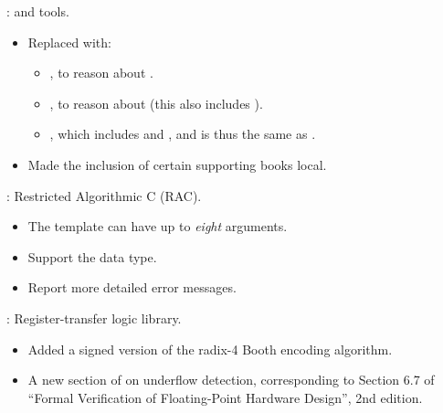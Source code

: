 
\begin{frame}

\implibtitle

:
 and  tools.
\begin{itemize}
\item Replaced  with:
      \begin{itemize}
      \item {}, to reason about .
      \item {}, to reason about 
            (this also includes ).
      \item {},
            which includes  and ,
            and is thus the same as .
      \end{itemize}
\item Made the inclusion of certain supporting books local.
\end{itemize}

\end{frame}


\begin{frame}

\implibtitle

:
Restricted Algorithmic C (RAC).
\begin{itemize}
\item The  template can have up to {\em eight} arguments.
\item Support the  data type.
\item Report more detailed error messages.
\end{itemize}

\end{frame}


\begin{frame}

\implibtitle

:
Register-transfer logic library.
\begin{itemize}
\item Added a signed version of the radix-4 Booth encoding algorithm.
\item A new section of  on
      underflow detection, corresponding to Section 6.7 of ``Formal
      Verification of Floating-Point Hardware Design'', 2nd edition.
\end{itemize}

\end{frame}

